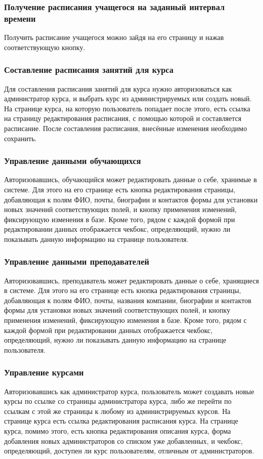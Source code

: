 \documentclass[11pt]{article}
\begin{document}
\subsubsection{Получение расписания учащегося на заданный интервал времени}
\label{sec:org4430b2d}
Получить расписание учащегося можно зайдя на его страницу и нажав соответствующую кнопку.
\subsubsection{Составление расписания занятий для курса}
\label{sec:org6aa472c}
Для составления расписания занятий для курса нужно авторизоваться как администратор курса,
и выбрать курс из администрируемых или создать новый. На странице курса, на которую
пользователь попадает после этого, есть ссылка на страницу редактирования расписания, с
помощью которой и составляется расписание. После составления расписания, внесённые изменения
необходимо сохранить.
\subsubsection{Управление данными обучающихся}
\label{sec:org3c82cc7}
Авторизовавшись, обучающийся может редактировать данные о себе, хранимые в системе. Для
этого на его странице есть кнопка редактирования страницы, добавляющая к полям ФИО, почты,
биографии и контактов формы для установки новых значений соответствующих полей, и кнопку
применения изменений, фиксирующую изменения в базе. Кроме того, рядом с каждой формой при
редактировании данных отображается чекбокс, определяющий, нужно ли показывать данную
информацию на странице пользователя.
\subsubsection{Управление данными преподавателей}
\label{sec:org3a6d622}
Авторизовавшись, преподаватель может редактировать данные о себе, хранящиеся в системе. Для
этого на его странице есть кнопка редактирования страницы, добавляющая к полям ФИО, почты,
названия компании, биографии и контактов формы для установки новых значений соответствующих
полей, и кнопку применения изменений, фиксирующую изменения в базе. Кроме того, рядом с каждой формой при
редактировании данных отображается чекбокс, определяющий, нужно ли показывать данную
информацию на странице пользователя.
\subsubsection{Управление курсами}
\label{sec:org29f0853}
Авторизовавшись как администратор курса, пользователь может создавать новые курсы по ссылке
со страницы администратора курса, либо же перейти по ссылкам с этой же страницы к любому из
администрируемых курсов. На странице курса есть ссылка редактирования расписания курса. На
странице курса, помимо этого, есть кнопка редактирования описания курса, форма добавления
новых администраторов со списком уже добавленных, и чекбокс, определяющий, доступен ли курс
пользователям, отличным от администраторов.
\end{document}
